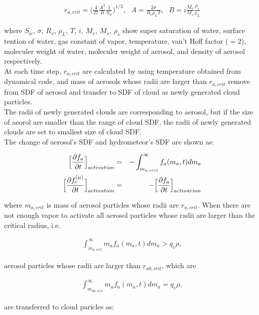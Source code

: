 \begin{eqnarray}
r_{a,crit}=\bigl( \frac{4}{27}\frac{A^{3}}{B}\frac{1}{S_{w}}\Bigr )^{1/3}, \:\:\:A=\frac{2\sigma}{R_{v}\rho_{L}T},\:\:\: B=i\frac{M_{v}}{M_{s}}\frac{\rho_{s}}{\rho_{L}}
\end{eqnarray}

where $S_{w}$, $\sigma$, $R_{v}$, $\rho_{L}$, $T$, $i$, $M_{v}$, $M_{s}$, $\rho_{s}$ show super saturation of water, surface tention of water, gas constant of vapor, temperature, van't Hoff factor ($=2$), moleculer weight of water, moleculer weight of aerosol, and density of aerosol respectively.\\
At each time step, $r_{a,crit}$ are calculated by using temperature obtained from dynamical code, and mass of aerosols whose radii are larger than $r_{a,crit}$ remove from SDF of aerosol and transfer to SDF of cloud as newly generated cloud particles.\\
The radii of newly generated clouds are corresponding to aerosol, but if the size of aeorol are smaller than the range of cloud SDF, the radii of newly generated clouds are set to smallest size of cloud SDF.\\
The change of aerosol's SDF and hydrometeor's SDF are shown as:

\begin{eqnarray}
\Bigl[\frac{\partial f_{a}}{\partial t}\Bigr]_{activation}&=&-\int_{m_{a,crit}}^{\infty}f_{a}(m_{a},t)dm_{a}\\
\Bigl[\frac{\partial f_{c}^{(\mu)}}{\partial t}\Bigr]_{activation}&=&-\Bigl[\frac{\partial f_{a}}{\partial t}\Bigr]_{activarion}
\end{eqnarray}

where $m_{a,crit}$ is mass of aerosol particles whose radii are $r_{a,crit}$. When there are not enough vapor to activate all aerosol particles whose radii are larger than the critical radius, i.e.

\begin{eqnarray}
\int_{m_{a,crit}}^{\infty}m_{a}f_{a}(m_{a},t)dm_{a} > q_{v}\rho,
\end{eqnarray}

aerosol particles whose radii are larger than $r_{a0,crit}$, which are

\begin{eqnarray}
\int_{m_{a0,crit}}^{\infty}m_{a}f_{a}(m_{a},t)dm_{a} = q_{v}\rho,
\end{eqnarray}


are transferred to cloud paricles as:

